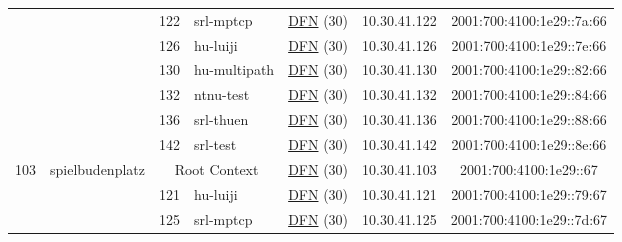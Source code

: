 \begin{small}
\begin{center}
\begin{longtable}{|c|c|c|c|c|c|c|c|}
  &  & \tiny{122} & \multicolumn{1}{|l|}{\tiny{srl-mptcp}} & \multicolumn{2}{|c|}{\tiny{\href{https://www.dfn.de}{DFN} (30)}} & \tiny{10.30.41.122} & \tiny{2001:700:4100:1e29::7a:66} \\* \cline{3-3}\cline{4-4}\cline{5-5}\cline{6-6}\cline{7-7}\cline{8-8}
  &  & \tiny{126} & \multicolumn{1}{|l|}{\tiny{hu-luiji}} & \multicolumn{2}{|c|}{\tiny{\href{https://www.dfn.de}{DFN} (30)}} & \tiny{10.30.41.126} & \tiny{2001:700:4100:1e29::7e:66} \\* \cline{3-3}\cline{4-4}\cline{5-5}\cline{6-6}\cline{7-7}\cline{8-8}
  &  & \tiny{130} & \multicolumn{1}{|l|}{\tiny{hu-multipath}} & \multicolumn{2}{|c|}{\tiny{\href{https://www.dfn.de}{DFN} (30)}} & \tiny{10.30.41.130} & \tiny{2001:700:4100:1e29::82:66} \\* \cline{3-3}\cline{4-4}\cline{5-5}\cline{6-6}\cline{7-7}\cline{8-8}
  &  & \tiny{132} & \multicolumn{1}{|l|}{\tiny{ntnu-test}} & \multicolumn{2}{|c|}{\tiny{\href{https://www.dfn.de}{DFN} (30)}} & \tiny{10.30.41.132} & \tiny{2001:700:4100:1e29::84:66} \\* \cline{3-3}\cline{4-4}\cline{5-5}\cline{6-6}\cline{7-7}\cline{8-8}
  &  & \tiny{136} & \multicolumn{1}{|l|}{\tiny{srl-thuen}} & \multicolumn{2}{|c|}{\tiny{\href{https://www.dfn.de}{DFN} (30)}} & \tiny{10.30.41.136} & \tiny{2001:700:4100:1e29::88:66} \\* \cline{3-3}\cline{4-4}\cline{5-5}\cline{6-6}\cline{7-7}\cline{8-8}
  &  & \tiny{142} & \multicolumn{1}{|l|}{\tiny{srl-test}} & \multicolumn{2}{|c|}{\tiny{\href{https://www.dfn.de}{DFN} (30)}} & \tiny{10.30.41.142} & \tiny{2001:700:4100:1e29::8e:66} \\ \hline
 \multirow{7}{*}{\tiny{103}} & \multicolumn{1}{|l|}{\multirow{7}{*}{\tiny{spielbudenplatz}}} & \multicolumn{2}{|c|}{\tiny{Root Context}} & \multicolumn{2}{|c|}{\tiny{\href{https://www.dfn.de}{DFN} (30)}} & \tiny{10.30.41.103} & \tiny{2001:700:4100:1e29::67} \\* \cline{3-3}\cline{4-4}\cline{5-5}\cline{6-6}\cline{7-7}\cline{8-8}
  &  & \tiny{121} & \multicolumn{1}{|l|}{\tiny{hu-luiji}} & \multicolumn{2}{|c|}{\tiny{\href{https://www.dfn.de}{DFN} (30)}} & \tiny{10.30.41.121} & \tiny{2001:700:4100:1e29::79:67} \\* \cline{3-3}\cline{4-4}\cline{5-5}\cline{6-6}\cline{7-7}\cline{8-8}
  &  & \tiny{125} & \multicolumn{1}{|l|}{\tiny{srl-mptcp}} & \multicolumn{2}{|c|}{\tiny{\href{https://www.dfn.de}{DFN} (30)}} & \tiny{10.30.41.125} & \tiny{2001:700:4100:1e29::7d:67} \\* \cline{3-3}\cline{4-4}\cline{5-5}\cline{6-6}\cline{7-7}\cline{8-8}

\end{longtable}
\end{center}
\end{small}
